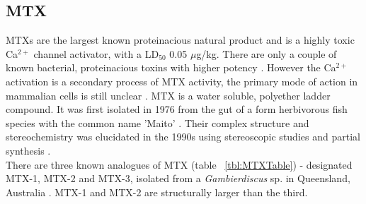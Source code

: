 \documentclass[12pt]{article}
\begin{document}
\subsection{MTX}

MTXs are the largest known proteinacious natural product \cite{yokoyama1988some,murata1993structure} and is a highly toxic Ca$^{2+}$ channel activator, with a LD$_{50}$ 0.05 $\mu$g/kg. There are only a couple of known bacterial, proteinacious toxins with higher potency \cite{yokoyama1988some,murata1993structure}. However the Ca$^{2+}$ activation is a secondary process of MTX activity, the primary mode of action in mammalian cells  is still unclear \cite{van2000diversity}. MTX is a water soluble, polyether ladder compound. It was first isolated in 1976 from the gut of a form herbivorous fish species with the common name 'Maito' \cite{yasumoto1976toxicity}. Their complex structure and stereochemistry was elucidated in the 1990s using stereoscopic studies and partial synthesis \cite{murata1993structure,murata1994structure,satake1995structural,nonomura1996complete,zheng1996complete}. \\

There are three known analogues of MTX (table ~\ref{tbl:MTXTable}) - designated MTX-1, MTX-2 and MTX-3, isolated from a \emph{Gambierdiscus} sp. in Queensland, Australia \cite{holmes1994purification}. MTX-1 and MTX-2 are structurally larger than the third. \\ %


\end{document}
